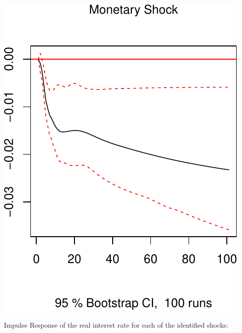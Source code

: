 \documentclass[11pt,preprint, authoryear]{elsarticle}
\numberwithin{equation}{section}
\numberwithin{figure}{section}
\numberwithin{table}{section}
\begin{document}
\includegraphics{TS_proj_files/figure-latex/unnamed-chunk-39-3.pdf}

\newpage

Impulse Response of the real interest rate for each of the identified
shocks:
\end{document}
